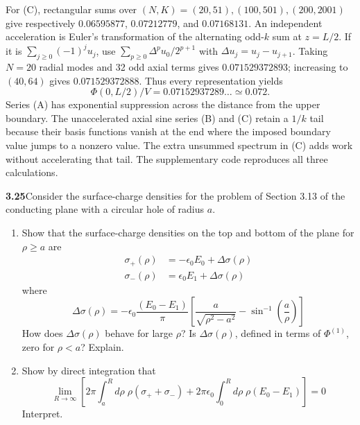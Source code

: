 For (C), rectangular sums over $(N,K)=(20,51),(100,501),(200,2001)$
give respectively $0.06595877$, $0.07212779$, and $0.07168131$.
An independent acceleration is Euler's transformation of the
alternating odd-$k$ sum at $z=L/2$.  If it is
$\sum_{j\geq0}(-1)^ju_j$, use
$\sum_{p\geq0}\Delta^pu_0/2^{p+1}$ with
$\Delta u_j=u_j-u_{j+1}$.  Taking $N=20$ radial modes and 32 odd
axial terms gives $0.071529372893$; increasing to $(40,64)$ gives
$0.071529372888$.  Thus every representation yields
\[
\boxed{\Phi(0,L/2)/V=0.07152937289\ldots\simeq0.072.}
\]
Series (A) has exponential suppression across the distance from the
upper boundary.  The unaccelerated axial sine series (B) and (C)
retain a $1/k$ tail because their basis functions vanish at the end
where the imposed boundary value jumps to a nonzero value.  The
extra unsummed spectrum in (C) adds work without accelerating that
tail.  The supplementary code reproduces all three calculations.

\par\bigskip
\noindent\textbf{3.25}\quad Consider the surface-charge densities for the problem of Section 3.13 of the conducting plane with a circular hole of radius $a$.
\begin{enumerate}
\item[(a)] Show that the surface-charge densities on the top and bottom of the plane for $\rho\geq a$ are
\begin{align*}
\sigma_{+}(\rho)&=-\epsilon_{0}E_{0}+\Delta\sigma(\rho)\\
\sigma_{-}(\rho)&=\epsilon_{0}E_{1}+\Delta\sigma(\rho)
\end{align*}
where
\[
\Delta\sigma(\rho)=-\epsilon_{0}\frac{(E_{0}-E_{1})}{\pi}\left[\frac{a}{\sqrt{\rho^{2}-a^{2}}}-\sin^{-1}\!\left(\frac{a}{\rho}\right)\right]
\]
How does $\Delta\sigma(\rho)$ behave for large $\rho$? Is $\Delta\sigma(\rho)$, defined in terms of $\Phi^{(1)}$, zero for $\rho<a$? Explain.
\item[(b)] Show by direct integration that
\[
\lim_{R\to\infty}\left[2\pi\int_{a}^{R}d\rho\;\rho(\sigma_{+}+\sigma_{-})+2\pi\epsilon_{0}\int_{0}^{R}d\rho\;\rho(E_{0}-E_{1})\right]=0
\]
Interpret.
\end{enumerate}
\solution

